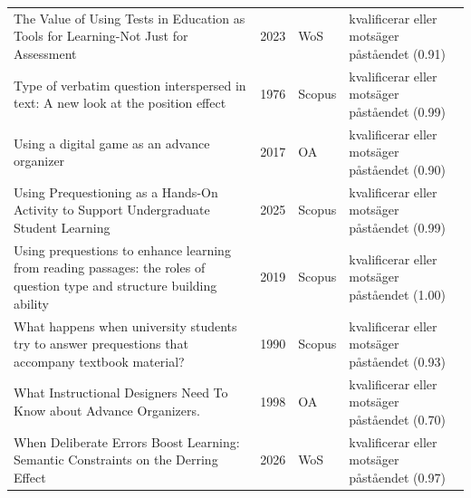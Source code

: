 \begin{longtable}{@{}%
  >{\raggedright\arraybackslash}p{}c%
  >{\raggedright\arraybackslash}p{}%
  >{\raggedright\arraybackslash}p{}@{}}
The Value of Using Tests in Education as Tools for Learning-Not Just for Assessment & 2023 & WoS & kvalificerar eller motsäger påståendet (0.91) \\
Type of verbatim question interspersed in text: A new look at the position effect & 1976 & Scopus & kvalificerar eller motsäger påståendet (0.99) \\
Using a digital game as an advance organizer & 2017 & OA & kvalificerar eller motsäger påståendet (0.90) \\
Using Prequestioning as a Hands-On Activity to Support Undergraduate Student Learning & 2025 & Scopus & kvalificerar eller motsäger påståendet (0.99) \\
Using prequestions to enhance learning from reading passages: the roles of question type and structure building ability & 2019 & Scopus & kvalificerar eller motsäger påståendet (1.00) \\
What happens when university students try to answer prequestions that accompany textbook material? & 1990 & Scopus & kvalificerar eller motsäger påståendet (0.93) \\
What Instructional Designers Need To Know about Advance Organizers. & 1998 & OA & kvalificerar eller motsäger påståendet (0.70) \\
When Deliberate Errors Boost Learning: Semantic Constraints on the Derring Effect & 2026 & WoS & kvalificerar eller motsäger påståendet (0.97) \\
\end{longtable}
\endgroup
